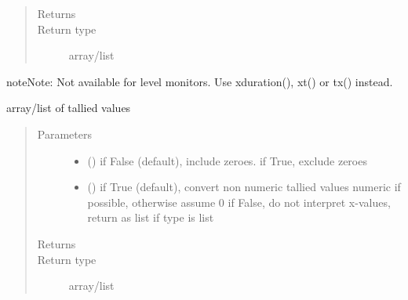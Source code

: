\documentclass[letterpaper,10pt,english]{sphinxmanual}
\begin{document}
\begin{fulllineitems}
\begin{fulllineitems}
\begin{quote}
\begin{description}
\begin{itemize}
\end{itemize}

\item[{Returns}] \leavevmode
{}

\item[{Return type}] \leavevmode
array/list

\end{description}\end{quote}

\begin{sphinxadmonition}{note}{Note:}
Not available for level monitors. Use xduration(), xt() or tx() instead.
\end{sphinxadmonition}

\end{fulllineitems}


\begin{fulllineitems}
\label{\detokenize{Reference:salabim.Monitor.xduration}}
array/list of tallied values
\begin{quote}\begin{description}
\item[{Parameters}] \leavevmode\begin{itemize}
\item {} 
 () \textendash{} if False (default), include zeroes. if True, exclude zeroes

\item {} 
 () \textendash{} if True (default), convert non numeric tallied values numeric if possible, otherwise assume 0 
if False, do not interpret x-values, return as list if type is list

\end{itemize}

\item[{Returns}] \leavevmode
{}

\item[{Return type}] \leavevmode
array/list

\end{description}\end{quote}


\end{fulllineitems}
\end{fulllineitems}
\end{document}
